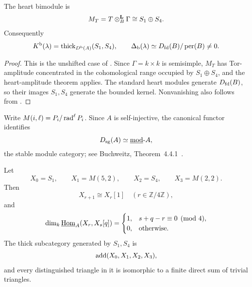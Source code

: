\begin{proposition}\label{prop:a63-bounded-kernel}
The heart bimodule is
\[
 M_T=T\otimes^{\mathbf L}_B\Gamma\cong S_1\oplus S_4.
\]
Consequently
\[
 K^{\mathrm b}(\lambda)=\operatorname{thick}_{D^{\mathrm b}(A)}(S_1,S_4),
 \qquad
 \Delta_{\mathrm b}(\lambda)\simeq D_{\mathrm{fd}}(B)/\operatorname{per}(B)\ne0.
\]
\end{proposition}

\begin{proof}
This is the unshifted case of .  Since
\(\Gamma=k\times k\) is semisimple, \(M_T\) has Tor-amplitude concentrated in the cohomological range occupied by \(S_1\oplus S_4\), and the heart-amplitude theorem applies.  The standard heart modules generate \(D_{\mathrm{fd}}(B)\), so their images \(S_1,S_4\) generate the bounded kernel.  Nonvanishing also follows from .
\end{proof}

Write \(M(i,\ell)=P_i/\operatorname{rad}^\ell P_i\).  Since \(A\) is self-injective, the canonical functor identifies
\[
 D_{\mathrm{sg}}(A)\simeq\underline{\operatorname{mod}}\text{-}A,
\]
the stable module category; see Buchweitz, Theorem~4.4.1~\cite{Buchweitz}.

\begin{lemma}\label{lem:a63-stable}
Let
\[
 X_0=S_1,
 \qquad
 X_1=M(5,2),
 \qquad
 X_2=S_4,
 \qquad
 X_3=M(2,2).
\]
Then
\[
 X_{r+1}\cong X_r[1]
 \quad(r\in\mathbb Z/4\mathbb Z),
\]
and
\[
 \dim_k\underline{\operatorname{Hom}}_A(X_r,X_s[q])
 =
 \begin{cases}
 1,&s+q-r\equiv0\pmod4,\\
 0,&\text{otherwise}.
 \end{cases}
\]
The thick subcategory generated by \(S_1,S_4\) is
\[
 \operatorname{add}(X_0,X_1,X_2,X_3),
\]
and every distinguished triangle in it is isomorphic to a finite direct sum of trivial triangles.
\end{lemma}

